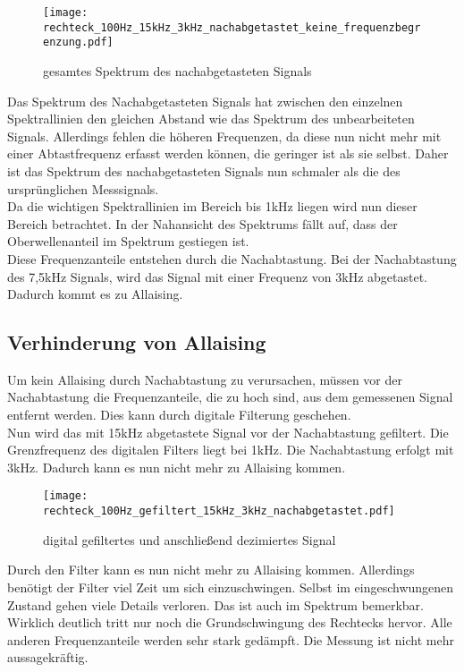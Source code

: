 \documentclass{article}%
\begin{document}
	\begin{figure}[htb]
		\centering
		\texttt{[image: rechteck\_100Hz\_15kHz\_3kHz\_nachabgetastet\_keine\_frequenzbegrenzung.pdf]}
		\caption{gesamtes Spektrum des nachabgetasteten Signals}
	\end{figure}	

	Das Spektrum des Nachabgetasteten Signals hat zwischen den einzelnen Spektrallinien den gleichen Abstand wie das Spektrum des 
	unbearbeiteten Signals. Allerdings fehlen die höheren Frequenzen, da diese nun nicht mehr mit einer Abtastfrequenz erfasst werden 
	können, die geringer ist als sie selbst. Daher ist das Spektrum des nachabgetasteten Signals nun schmaler als die des ursprünglichen 
	Messsignals.\\

	Da die wichtigen Spektrallinien im Bereich bis 1kHz liegen wird nun dieser Bereich betrachtet. In der Nahansicht des Spektrums fällt auf,
 	dass der Oberwellenanteil im Spektrum gestiegen ist.\\
	Diese Frequenzanteile entstehen durch die Nachabtastung. Bei der Nachabtastung des 7,5kHz Signals, wird das Signal mit einer Frequenz 
	von 3kHz abgetastet. Dadurch kommt es zu Allaising.\\

\subsection{Verhinderung von Allaising}

	Um kein Allaising durch Nachabtastung zu verursachen, müssen vor der Nachabtastung die Frequenzanteile, die zu hoch sind, aus dem 
	gemessenen Signal entfernt werden. Dies kann durch digitale Filterung geschehen.\\

	Nun wird das mit 15kHz abgetastete Signal vor der Nachabtastung gefiltert. Die Grenzfrequenz des digitalen Filters liegt bei 1kHz. Die 
	Nachabtastung erfolgt mit 3kHz. Dadurch kann es nun nicht mehr zu Allaising kommen. 

	\begin{figure}[htb]
		\centering
		\texttt{[image: rechteck\_100Hz\_gefiltert\_15kHz\_3kHz\_nachabgetastet.pdf]}
		\caption{digital gefiltertes und anschließend dezimiertes Signal}
	\end{figure}	

	Durch den Filter kann es nun nicht mehr zu Allaising kommen. Allerdings benötigt der Filter viel Zeit um sich einzuschwingen. Selbst im 
	eingeschwungenen Zustand gehen viele Details verloren. Das ist auch im Spektrum bemerkbar. Wirklich deutlich tritt nur noch die 
	Grundschwingung des Rechtecks hervor. Alle anderen Frequenzanteile werden sehr stark gedämpft. Die Messung ist nicht mehr 	
 	aussagekräftig.
	
\end{document}

